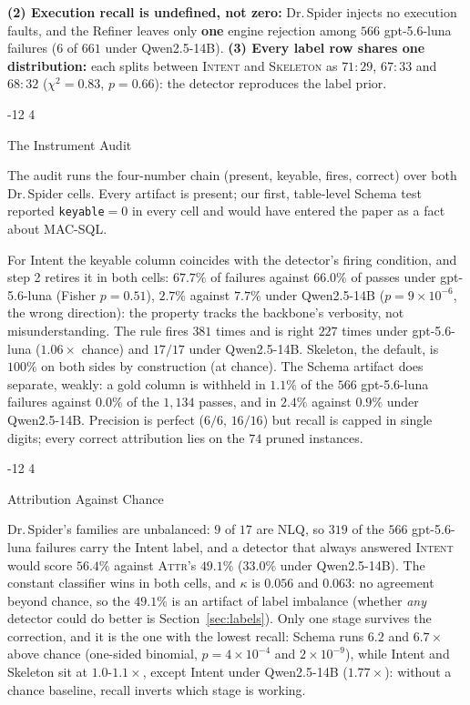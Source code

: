 \documentclass{llncs}
\makeatletter
\renewcommand\subsubsection{\@startsection{subsubsection}{3}{\z@}%
  {-12\p@ \@plus -4\p@ \@minus -4\p@}%
  {4\p@ \@plus 2\p@ \@minus 2\p@}%
  {\normalfont\normalsize\bfseries\boldmath\raggedright}}
\makeatother
\begin{document}
\noindent\textbf{(2) Execution recall is undefined, not zero:} Dr.\,Spider
injects no execution faults, and the Refiner leaves only \textbf{one} engine
rejection among $566$ gpt-5.6-luna failures ($6$ of $661$ under Qwen2.5-14B).
\noindent\textbf{(3) Every label row shares one distribution:} each splits
between \textsc{Intent} and \textsc{Skeleton} as $71{:}29$, $67{:}33$ and
$68{:}32$ ($\chi^2 = 0.83$, $p = 0.66$): the detector reproduces the label
prior.

\subsubsection{The Instrument Audit}
\label{sec:audit}

The audit runs the four-number chain (present, keyable, fires, correct) over
both Dr.\,Spider cells. Every artifact is present; our first, table-level
Schema test reported \texttt{keyable}$=0$ in every cell and would have entered
the paper as a fact about MAC-SQL.

For Intent the keyable column coincides with the detector's firing
condition, and step 2 retires it in both cells: $67.7\%$ of failures
against $66.0\%$ of passes under gpt-5.6-luna (Fisher $p = 0.51$), $2.7\%$
against $7.7\%$ under Qwen2.5-14B ($p = 9{\times}10^{-6}$, the wrong
direction): the property tracks the backbone's verbosity, not
misunderstanding. The rule fires $381$ times and is right $227$ times under
gpt-5.6-luna ($1.06\times$ chance) and $17/17$ under Qwen2.5-14B. Skeleton,
the default, is $100\%$ on both sides by construction (at chance). The Schema artifact does separate, weakly: a gold
column is withheld in $1.1\%$ of the $566$ gpt-5.6-luna failures against
$0.0\%$ of the $1{,}134$ passes, and in $2.4\%$ against $0.9\%$ under
Qwen2.5-14B. Precision is perfect ($6/6$, $16/16$) but recall is capped in single digits;
every correct attribution lies on the $74$ pruned instances.

\subsubsection{Attribution Against Chance}
\label{sec:chance}

Dr.\,Spider's families are unbalanced: $9$ of $17$ are NLQ, so $319$ of the
$566$ gpt-5.6-luna failures carry the Intent label, and a detector that
always answered \textsc{Intent} would score $56.4\%$ against \textsc{Attr}'s
$49.1\%$ ($33.0\%$ under Qwen2.5-14B). The constant classifier wins in both
cells, and $\kappa$ is $0.056$ and $0.063$: no agreement beyond chance, so the
$49.1\%$ is an artifact of label imbalance (whether \emph{any} detector could
do better is Section~\ref{sec:labels}). Only one stage survives the
correction, and it is the one with the lowest recall: Schema runs $6.2$ and
$6.7\times$ above chance (one-sided binomial, $p = 4{\times}10^{-4}$ and
$2{\times}10^{-9}$), while Intent and Skeleton sit at
$1.0$-$1.1\times$, except Intent under Qwen2.5-14B ($1.77\times$): without a
chance baseline, recall inverts which stage is working.
\end{document}
